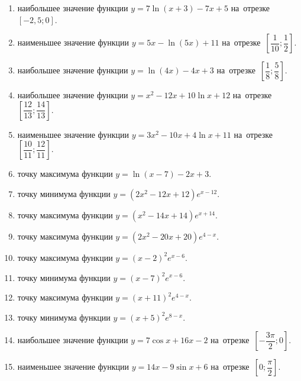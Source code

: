 \documentclass[a4paper,10pt]{article}
\begin{document}
\begin{enumerate}
\item {} наибольшее значение функции $y=7\ln \left(x+3\right)-7x+5$ на~отрезке~$\left[-2,5;0\right]$.

\item {} наименьшее значение функции $y=5x-\ln \left(5x\right)+11$ на~отрезке~$\left[\dfrac{1}{10};\dfrac{1}{2}\right]$.

\item {} наибольшее значение функции $y=\ln \left(4x\right)-4x+3$ на~отрезке~$\left[\dfrac{1}{8};\dfrac{5}{8}\right]$.

\item {} наибольшее значение функции $y=x^2-12x+10\ln x+12$ на~отрезке~$\left[\dfrac{12}{13};\dfrac{14}{13}\right]$.

\item {} наименьшее значение функции $y=3x^2-10x+4\ln x+11$ на~отрезке~$\left[\dfrac{10}{11};\dfrac{12}{11}\right]$.

\item {} точку максимума функции $y=\ln \left(x-7\right)-2x+3$.

\item {} точку минимума функции $y=\left(2x^2-12x+12\right)e^{x-12}$.

\item {} точку максимума функции $y=\left(x^2-14x+14\right)e^{x+14}$.

\item {} точку максимума функции $y=\left(2x^2-20x+20\right)e^{4-x}$.

\item {} точку максимума функции $y=\left(x-2\right)^2e^{x-6}$.

\item {} точку минимума функции $y=\left(x-7\right)^2e^{x-6}$.

\item {} точку максимума функции $y=\left(x+11\right)^2e^{4-x}$.

\item {} точку минимума функции $y=\left(x+5\right)^2e^{8-x}$.

\item {} наибольшее значение функции $y=7\cos x+16x-2$ на~отрезке~$\left[-\dfrac{3\pi }{2};0\right]$.

\item {} наименьшее значение функции $y=14x-9\sin x+6$ на~отрезке~$\left[0;\dfrac{\pi }{2}\right]$.


\end{enumerate}
\end{document}
